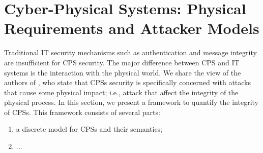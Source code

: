 
 
\section{Cyber-Physical Systems: Physical Requirements and Attacker Models}
Traditional IT security mechanisms such as authentication and message integrity are insufficient for CPS security. %
The major difference between CPS and IT systems is the interaction with the physical world. We share the view of the authors of \cite{CPSSecVinyl}, who state that CPSs security is {specifically} concerned with attacks that cause some physical impact; i.e., attack that affect the integrity of the physical process.  %
In this section, we present a framework to quantify the integrity of CPSs. This framework consists of several parts:
\begin{enumerate}
  \item a discrete model for CPSs and their semantics; 
  \item ... 
\end{enumerate}

